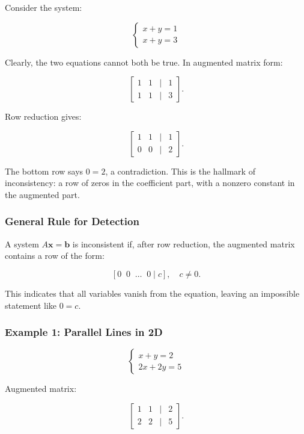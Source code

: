 \documentclass[
  letterpaper,
  DIV=11,
  numbers=noendperiod]{scrreprt}
\begin{document}
Consider the system:

\[
\begin{cases}  
x + y = 1 \\  
x + y = 3  
\end{cases}
\]

Clearly, the two equations cannot both be true. In augmented matrix
form:

\[
\begin{bmatrix}  
1 & 1 & | & 1 \\  
1 & 1 & | & 3  
\end{bmatrix}.
\]

Row reduction gives:

\[
\begin{bmatrix}  
1 & 1 & | & 1 \\  
0 & 0 & | & 2  
\end{bmatrix}.
\]

The bottom row says \(0 = 2\), a contradiction. This is the hallmark of
inconsistency: a row of zeros in the coefficient part, with a nonzero
constant in the augmented part.

\subsubsection{General Rule for
Detection}\label{general-rule-for-detection}

A system \(A\mathbf{x} = \mathbf{b}\) is inconsistent if, after row
reduction, the augmented matrix contains a row of the form:

\[
[0 \;\; 0 \;\; \dots \;\; 0 \;|\; c], \quad c \neq 0.
\]

This indicates that all variables vanish from the equation, leaving an
impossible statement like \(0 = c\).

\subsubsection{Example 1: Parallel Lines in
2D}\label{example-1-parallel-lines-in-2d}

\[
\begin{cases}  
x + y = 2 \\  
2x + 2y = 5  
\end{cases}
\]

Augmented matrix:

\[
\begin{bmatrix}  
1 & 1 & | & 2 \\  
2 & 2 & | & 5  
\end{bmatrix}.
\]
\end{document}
